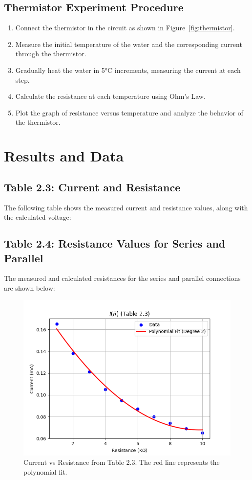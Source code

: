 \documentclass[journal]{IEEEtran}
\begin{document}
\subsection{Thermistor Experiment Procedure}
\begin{enumerate}
    \item Connect the thermistor in the circuit as shown in Figure~\ref{fig:thermistor}.
    \item Measure the initial temperature of the water and the corresponding current through the thermistor.
    \item Gradually heat the water in 5°C increments, measuring the current at each step.
    \item Calculate the resistance at each temperature using Ohm’s Law.
    \item Plot the graph of resistance versus temperature and analyze the behavior of the thermistor.
\end{enumerate}
\section{Results and Data}

\subsection{Table 2.3: Current and Resistance}
The following table shows the measured current and resistance values, along with the calculated voltage:



\subsection{Table 2.4: Resistance Values for Series and Parallel}
The measured and calculated resistances for the series and parallel connections are shown below:



\begin{figure}[H]
    \centering
    \includegraphics[width=\linewidth]{output_plots/current_vs_resistance_table_2_3.png}
    \caption{Current vs Resistance from Table 2.3. The red line represents the polynomial fit.}
\end{figure}
  
\end{document}
